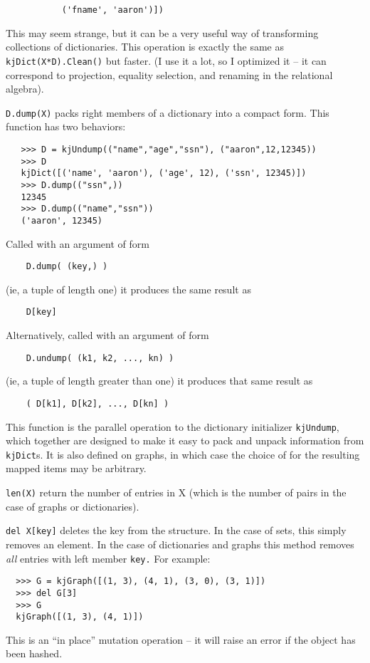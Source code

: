 \begin{description}
\begin{verbatim}
           ('fname', 'aaron')])
\end{verbatim}
This may seem strange, but it can be a very useful way
of transforming collections of dictionaries.
This operation is exactly the same as
{\tt kjDict(X*D).Clean()} but faster.  (I use
it a lot, so I optimized it -- it can correspond
to projection, equality selection, and renaming in
the relational algebra).  
%
\item{\tt D.dump(X)} 
packs right members of a dictionary into a compact form.
This function has two behaviors:
\begin{verbatim}
   >>> D = kjUndump(("name","age","ssn"), ("aaron",12,12345))
   >>> D
   kjDict([('name', 'aaron'), ('age', 12), ('ssn', 12345)])
   >>> D.dump(("ssn",))
   12345
   >>> D.dump(("name","ssn"))
   ('aaron', 12345)
\end{verbatim}
Called with an argument of form
\begin{verbatim}
    D.dump( (key,) )
\end{verbatim}
(ie, a tuple of length one) it produces the same result as
\begin{verbatim}
    D[key]
\end{verbatim}
Alternatively, called with an argument of form
\begin{verbatim}
    D.undump( (k1, k2, ..., kn) )
\end{verbatim}
(ie, a tuple of length greater than one) it produces that same
result as
\begin{verbatim}
    ( D[k1], D[k2], ..., D[kn] )
\end{verbatim}
This function is the parallel operation to
the dictionary initializer {\tt kjUndump}, which together
are designed to make it easy to pack and unpack information
from {\tt kjDict}s.  It is also defined on graphs, in which
case the choice of for the resulting mapped items may be
arbitrary.
%
\item{\tt len(X)}
return the number of entries in X (which is the
number of pairs in the case of
graphs or dictionaries).
%
\item{\tt del X[key]}
deletes the key from the structure.  In the case of sets, this
simply removes an element.  In the case of dictionaries and graphs
this method removes {\em all} entries with left member {\tt key.}
For example:
\begin{verbatim}
  >>> G = kjGraph([(1, 3), (4, 1), (3, 0), (3, 1)])
  >>> del G[3]
  >>> G
  kjGraph([(1, 3), (4, 1)])
\end{verbatim}
This is an ``in place'' mutation operation -- it will raise an
error if the object has been hashed.
\end{description}


